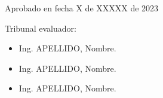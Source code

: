 Aprobado en fecha X de XXXXX de 2023

\vspace{2cm}

Tribunal evaluador:

\begin{itemize}

\item Ing. APELLIDO, Nombre. %
\item Ing. APELLIDO, Nombre. %
\item Ing. APELLIDO, Nombre. %
\end{itemize}
